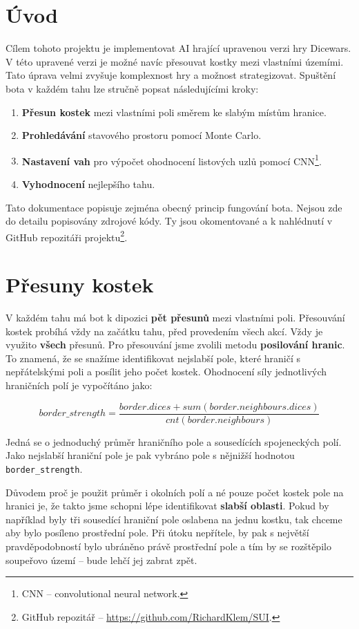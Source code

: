 \documentclass[12pt]{article}
\begin{document}
\afterpage{\cfoot{\thepage }}

\section{Úvod}
Cílem tohoto projektu je implementovat AI hrající upravenou verzi hry Dicewars. V této upravené verzi je možné navíc přesouvat kostky mezi vlastními územími. Tato úprava velmi zvyšuje komplexnost hry a možnost strategizovat. Spuštění bota v každém tahu lze stručně popsat následujícími kroky:
\begin{enumerate}
    \item \textbf{Přesun kostek} mezi vlastními poli směrem ke slabým místům hranice.
    \item \textbf{Prohledávání} stavového prostoru pomocí Monte Carlo.
    \item \textbf{Nastavení vah} pro výpočet ohodnocení listových uzlů pomocí CNN\footnote{CNN -- convolutional neural network.}.
    \item \textbf{Vyhodnocení} nejlepšího tahu.
\end{enumerate}

Tato dokumentace popisuje zejména obecný princip fungování bota. Nejsou zde do detailu popisovány zdrojové kódy. Ty jsou okomentované a k nahlédnutí v GitHub repozitáři projektu\footnote{GitHub repozitář -- \url{https://github.com/RichardKlem/SUI}.}.

\section{Přesuny kostek}
\label{transfer}
V každém tahu má bot k dipozici \textbf{pět přesunů} mezi vlastními poli. Přesouvání kostek probíhá vždy na začátku tahu, před provedením všech akcí. Vždy je využito \textbf{všech} přesunů. Pro přesouvání jsme zvolili metodu \textbf{posilování hranic}. To znamená, že se snažíme identifikovat nejslabší pole, které hraničí s nepřátelskými poli a posílit jeho počet kostek. Ohodnocení síly jednotlivých hraničních polí je vypočítáno jako:

\[ border\_strength = \frac{border.dices + sum(border.neighbours.dices)}{cnt(border.neighbours)} \]

Jedná se o jednoduchý průměr hraničního pole a sousedících spojeneckých polí. Jako nejslabší hraniční pole je pak vybráno pole s nějnižší hodnotou \texttt{border\_strength}. 

Důvodem proč je použit průměr i okolních polí a né pouze počet kostek pole na hranici je, že takto jsme schopni lépe identifikovat \textbf{slabší oblasti}. Pokud by například byly tři sousedící hraniční pole oslabena na jednu kostku, tak chceme aby bylo posíleno prostřední pole. Při útoku nepřítele, by pak s největší pravděpodobností bylo ubráněno právě prostřední pole a tím by se rozštěpilo soupeřovo území -- bude lehčí jej zabrat zpět.
\end{document}
